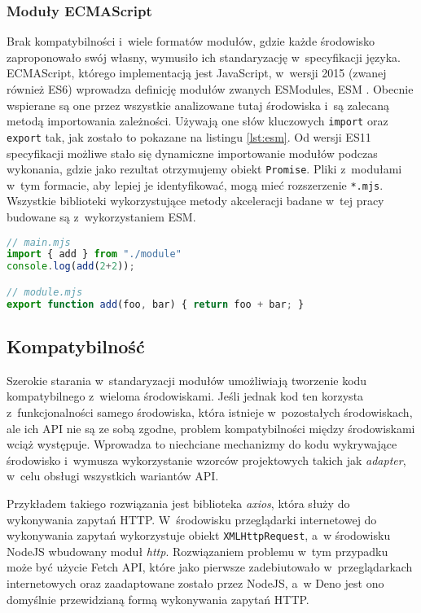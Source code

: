 \subsubsection{Moduły ECMAScript}

Brak kompatybilności i~wiele formatów modułów, gdzie każde środowisko zaproponowało swój własny, wymusiło ich standaryzację w~specyfikacji języka. ECMAScript, którego implementacją jest JavaScript, w~wersji 2015 (zwanej również ES6) wprowadza definicję modułów zwanych ESModules, ESM \cite{ESModules}. Obecnie wspierane są one przez wszystkie analizowane tutaj środowiska i~są zalecaną metodą importowania zależności. Używają one słów kluczowych \lstinline{import} oraz \lstinline{export} tak, jak zostało to pokazane na listingu \ref{lst:esm}. Od wersji ES11 specyfikacji możliwe stało się dynamiczne importowanie modułów podczas wykonania, gdzie jako rezultat otrzymujemy obiekt \mbox{\lstinline{Promise}}. Pliki z~modułami w~tym formacie, aby lepiej je identyfikować, mogą mieć rozszerzenie \mbox{\lstinline{*.mjs}}. Wszystkie biblioteki wykorzystujące metody akceleracji badane w~tej pracy budowane są z~wykorzystaniem ESM.

\begin{lstlisting}[language=JavaScript, caption=Przykład wykorzystania ECMAScript Modules, label=lst:esm]
// main.mjs
import { add } from "./module"
console.log(add(2+2));

// module.mjs
export function add(foo, bar) { return foo + bar; }
\end{lstlisting}

\subsection{Kompatybilność}

Szerokie starania w~standaryzacji modułów umożliwiają tworzenie kodu kompatybilnego z~wieloma środowiskami. Jeśli jednak kod ten korzysta z~funkcjonalności samego środowiska, która istnieje w~pozostałych środowiskach, ale ich API nie są ze sobą zgodne, problem kompatybilności między środowiskami wciąż występuje. Wprowadza to niechciane mechanizmy do kodu wykrywające środowisko i~wymusza wykorzystanie wzorców projektowych takich jak \textit{adapter}, w~celu obsługi wszystkich wariantów API.

Przykładem takiego rozwiązania jest biblioteka \textit{axios}, która służy do wykonywania zapytań HTTP. W~środowisku przeglądarki internetowej do wykonywania zapytań wykorzystuje obiekt \lstinline{XMLHttpRequest}, a~w środowisku NodeJS wbudowany moduł \textit{http}. Rozwiązaniem problemu w~tym przypadku może być użycie Fetch API, które jako pierwsze zadebiutowało w~przeglądarkach internetowych oraz zaadaptowane zostało przez NodeJS, a~w Deno jest ono domyślnie przewidzianą formą wykonywania zapytań HTTP.

